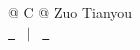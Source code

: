 
\begin{tabularx}{\linewidth}{@{} C @{}}
\Huge{Zuo Tianyou} \\[7.5pt]
\href{mailto:\Email}{\raisebox{-0.05\height}\faEnvelope \ \Email} \ $|$ \ 
\href{\PhoneHref}{\raisebox{-0.05\height}\faMobile \ \PhoneDisplay} \\
\end{tabularx}
